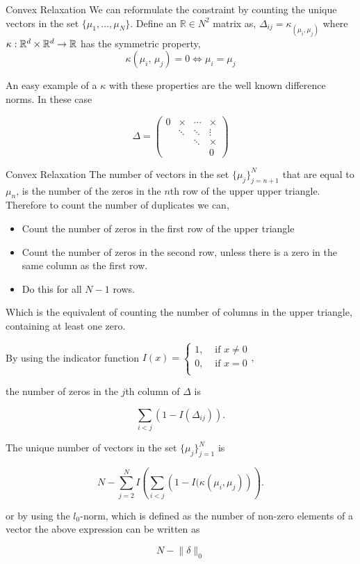 \documentclass[12pt]{beamer}
\begin{document}
\begin{frame}{Convex Relaxation}
	We can reformulate the constraint by counting the unique vectors in the set $\{\mu_1,\dots,\mu_N \}$.
	Define an $\mathbb{R} \in N^2$ matrix as, $\Delta_{ij} = \kappa_(\mu_i,\mu_j)$ where $\kappa \space : \space \mathbb{R}^d \times \mathbb{R}^d \rightarrow \mathbb{R}$ has the symmetric property,
	$$ \kappa(\mu_i,\,\mu_j) = 0 \iff \mu_i = \mu_j$$
	
	An easy example of a $\kappa$ with these properties are the well known difference norms. In these case
	
	$$ \Delta =\left(\begin{array}{*{20}{c}}
0& \times & \cdots & \times \\
{}& \ddots & \ddots & \vdots \\
{}&{}& \ddots & \times \\
{}&{}&{}&0
\end{array}
\right)
$$
\end{frame}




\begin{frame}{Convex Relaxation}
	The number of vectors in the set $\{\mu_j \}_{j=n+1}^N$ that are equal to $\mu_n$, is the number of the zeros in the $n$th row of the upper upper triangle. Therefore to count the number of duplicates we can,
	
	\begin{itemize}
		\item Count the number of zeros in the first row of the upper triangle
		\item Count the number of zeros in the second row, unless there is a zero in the same column as the first row.
		\item Do this for all $N-1$ rows.
	\end{itemize}
	
	Which is the equivalent of counting the number of columns in the upper triangle, containing at least one zero.
	
	
	
\end{frame}

\begin{frame}
	By using the indicator function $I(x) = \begin{cases}
	1, & \text{ if } x\neq0\\
	0, & \text{ if }  x = 0 \\
	\end{cases},$
	
	the number of zeros in the $j$th column of $\Delta$ is 
	
	$$ \sum_{i < j} \left(1 - I(\Delta_{ij})\right).$$
	
	The unique number of vectors in the set $\{\mu_j\}_{j=1}^N$ is
	
	$$ N - \sum_{j=2}^N I\left( \sum_{i<j} \left( 1 - I(\kappa(\mu_i,\mu_j) \right) \right).$$
	
	or by using the $l_0$-norm, which is defined as the number of non-zero elements of a vector the above expression can be written as
	
	$$ N - \lVert \delta \rVert_0 $$

	
\end{frame}
\end{document}
